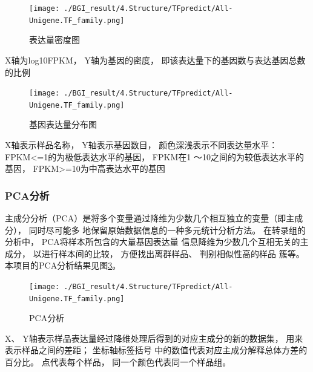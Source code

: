 \documentclass[10pt, oneside,a4paper]{article}
\begin{document}
\begin{figure}[H]
\centering
\texttt{[image: ./BGI\_result/4.Structure/TFpredict/All-Unigene.TF\_family.png]}
\par
\renewcommand{\figurename}{图}
\caption{表达量密度图}
\label{dens}
\end{figure}
\begin{center}
X轴为log10FPKM， Y轴为基因的密度， 即该表达量下的基因数与表达基因总数的比例
\end{center}

\begin{figure}[H]
\centering
\texttt{[image: ./BGI\_result/4.Structure/TFpredict/All-Unigene.TF\_family.png]}
\par
\renewcommand{\figurename}{图}
\caption{基因表达量分布图}
\label{exp}
\end{figure}
\begin{center}
X轴表示样品名称， Y轴表示基因数目， 颜色深浅表示不同表达量水平： FPKM<=1的为极低表达水平的基因， FPKM在1
～10之间的为较低表达水平的基因， FPKM>=10为中高表达水平的基因
\end{center}

\subsubsection{PCA分析}
主成分分析（PCA）是将多个变量通过降维为少数几个相互独立的变量（即主成分）， 同时尽可能多
地保留原始数据信息的一种多元统计分析方法。 在转录组的分析中， PCA将样本所包含的大量基因表达量
信息降维为少数几个互相无关的主成分， 以进行样本间的比较， 方便找出离群样品、 判别相似性高的样品
簇等。 本项目的PCA分析结果见图\ref{pca}。\par

\begin{figure}[H]
\centering
\texttt{[image: ./BGI\_result/4.Structure/TFpredict/All-Unigene.TF\_family.png]}
\par
\renewcommand{\figurename}{图}
\caption{PCA分析}
\label{pca}
\end{figure}
\begin{center}
X、 Y轴表示样品表达量经过降维处理后得到的对应主成分的新的数据集， 用来表示样品之间的差距； 坐标轴标签括号
中的数值代表对应主成分解释总体方差的百分比。 点代表每个样品， 同一个颜色代表同一个样品组。
\end{center}
\end{document}
